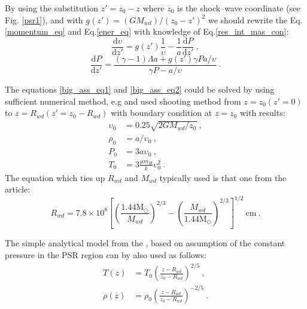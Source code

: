 \documentclass[oneside,a4paper,11pt]{report}
\begin{document}
By using the substitution $z' = z_0 - z$ where $z_0$ is the shock--wave coordinate (see Fig. \ref{psr1}),
and with $g(z') = (GM_{wd})/(z_0 - z')^2$ we should rewrite the Eq.\eqref{momentum_eq} and Eq.\eqref{ener_eq} 
with knowledge of Eq.\eqref{res_int_mas_con}:
\begin{equation}
 \label{big_ass_eq1}
\frac{\mathrm{d} \upsilon}{\mathrm{d} z'} = g(z')\frac{1}{\upsilon}-\frac{1}{a}\frac{\mathrm{d}P}{\mathrm{d}z'} \:,
\end{equation}
\begin{equation}
 \label{big_ass_eq2}
\frac{\mathrm{d}P}{\mathrm{d}z'} = \frac{(\gamma -1) \Lambda a + g(z')\gamma Pa / \upsilon}{\gamma P -a / \upsilon } \:.
\end{equation}

The equations \eqref{big_ass_eq1} and \eqref{big_ass_eq2} could be solved by using sufficient 
numerical method, e.g \citet{2005A&A...435..191S} and  \citet{1999MNRAS.306..684C} used shooting 
method from $z=z_0(z'=0)$ to $z = R_{wd}(z'=z_0-R_{wd})$ with boundary condition at $z=z_0$ with results:
\begin{equation}
 \label{res_shoot}
\begin{split}
\upsilon_0 &= 0.25\sqrt{2GM_{wd}/z_0}\:,\\
\rho_0 &= a / \upsilon_0\:,\\
P_0 &= 3a\upsilon_0\:,\\
T_0 &= 3\frac{\mu m_H}{k}\upsilon_0^2\:. 
\end{split}
\end{equation}
The equation which ties up $R_{wd}$ and $M_{wd}$ typically used is that one from 
the \citet{1972ApJ...175..417N} article:
\begin{equation}
 \label{rwd_mwd}
R_{wd} = 7.8 \times 10^8 \left[ \left( \frac{1.44\mathrm{M_\odot}}{M_{wd}} \right)^{2/3} -\left( \frac{M_{wd}}{1.44\mathrm{M_\odot}} \right)^{2/3} \right]^{1/2}\:\mathrm{cm}\:.
\end{equation}

The simple analytical model from the \citet{accpower:1}, based on assumption of the constant pressure 
in the PSR region can by also used as follows:
\begin{equation}
 \label{king_ana}
\begin{split}
T(z) &= T_0 \left( \frac{z - R_{wd}}{z_0 - R_{wd}}\right)^{2/5}\:,\\
\rho(z) &= \rho_0 \left( \frac{z - R_{wd}}{z_0 - R_{wd}}\right)^{-2/5}\:.
\end{split}
\end{equation}
\end{document}
